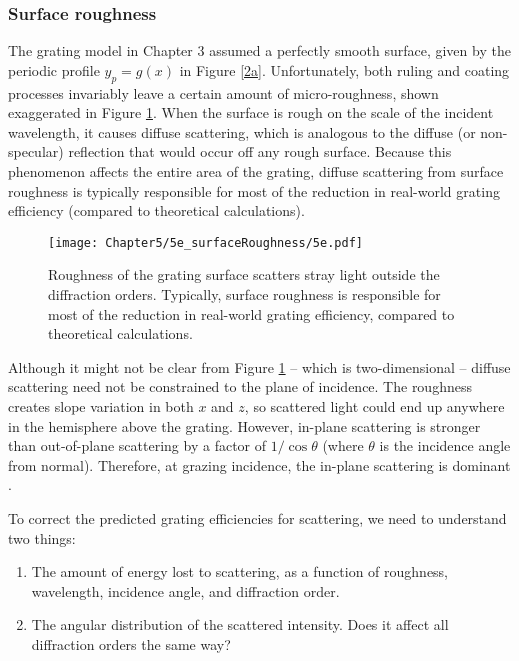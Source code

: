 \subsubsection{Surface roughness}
The grating model in Chapter 3 assumed a perfectly smooth surface, given by the periodic profile $y_p=g(x)$ in Figure \ref{2a}.  Unfortunately, both ruling and coating processes invariably leave a certain amount of micro-roughness, shown exaggerated in Figure \ref{5e}.  When the surface is rough on the scale of the incident wavelength, it causes diffuse scattering, which is analogous to the diffuse (or non-specular) reflection that would occur off any rough surface.  Because this phenomenon affects the entire  area of the grating, diffuse scattering from surface roughness is typically responsible for most of the reduction in real-world grating efficiency (compared to theoretical calculations).

\begin{figure}[htbp] %
   \centering
   \texttt{[image: Chapter5/5e\_surfaceRoughness/5e.pdf]} 
   \caption{Roughness of the grating surface scatters stray light outside the diffraction orders. Typically, surface roughness is responsible for most of the reduction in real-world grating efficiency, compared to theoretical calculations.}
   \label{5e}
\end{figure}
 
Although it might not be clear from Figure \ref{5e} -- which is two-dimensional -- diffuse scattering need not be constrained to the plane of incidence. The roughness creates slope variation in both $x$ and $z$, so scattered light could end up anywhere in the hemisphere above the grating.  However, in-plane scattering is stronger than out-of-plane scattering by a factor of $1/\cos\theta$ (where $\theta$ is the incidence angle from normal). Therefore, at grazing incidence, the in-plane scattering is dominant \cite{Sch02}.

To correct the predicted grating efficiencies for scattering, we need to understand two things:
\begin{enumerate}
\item The amount of energy lost to scattering, as a function of roughness, wavelength, incidence angle, and diffraction order.
\item The angular distribution of the scattered intensity. Does it affect all diffraction orders the same way?
\end{enumerate}

